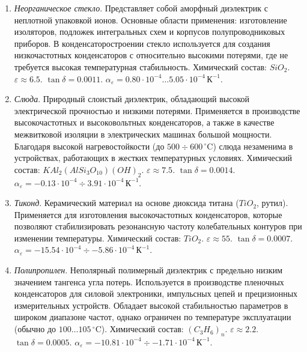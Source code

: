\begin{enumerate}
    \item \textit{Неорганическое стекло}.
    Представляет собой аморфный диэлектрик с неплотной упаковкой ионов.
    Основные области применения: изготовление изоляторов, подложек интегральных схем и корпусов полупроводниковых приборов.
    В конденсаторостроении стекло используется для создания низкочастотных конденсаторов с относительно высокими потерями, где не требуется высокая температурная стабильность.
    Химический состав: $SiO_2$.
    $\varepsilon \approx 6.5$.
    $\tan\delta = 0.0011$.
    $\alpha_\varepsilon = 0.80 \cdot 10^{-4} \dots 5.05 \cdot 10^{-4}\,\text{К}^{-1}$.

    \item \textit{Слюда}.
    Природный слоистый диэлектрик, обладающий высокой электрической прочностью и низкими потерями.
    Применяется в производстве высокочастотных и высоковольтных конденсаторов, а также в качестве межвитковой изоляции в электрических машинах большой мощности.
    Благодаря высокой нагревостойкости (до $500 \div 600\,^\circ\text{C}$) слюда незаменима в устройствах, работающих в жестких температурных условиях.
    Химический состав: $KAl_2(AlSi_3O_{10})(OH)_2$.
    $\varepsilon \approx 7.5$.
    $\tan\delta = 0.0014$.
    $\alpha_\varepsilon = -0.13 \cdot 10^{-4} \div 3.91 \cdot 10^{-4}\,\text{К}^{-1}$.

    \item \textit{Тиконд}.
    Керамический материал на основе диоксида титана ($TiO_2$, рутил).
    Применяется для изготовления высокочастотных конденсаторов, которые позволяют стабилизировать резонансную частоту колебательных контуров при изменении температуры.
    Химический состав: $TiO_2$.
    $\varepsilon \approx 55$.
    $\tan\delta = 0.0007$.
    $\alpha_\varepsilon = -15.54 \cdot 10^{-4} \div -5.86 \cdot 10^{-4}\,\text{К}^{-1}$.

    \item \textit{Полипропилен}.
    Неполярный полимерный диэлектрик с предельно низким значением тангенса угла потерь.
    Используется в производстве пленочных конденсаторов для силовой электроники, импульсных цепей и прецизионных измерительных устройств.
    Обладает высокой стабильностью параметров в широком диапазоне частот, однако ограничен по температуре эксплуатации (обычно до $100 \dots 105\,^\circ\text{C}$).
    Химический состав: $(C_3H_6)_n$.
    $\varepsilon \approx 2.2$.
    $\tan\delta = 0.0005$.
    $\alpha_\varepsilon = -10.81 \cdot 10^{-4} \div -1.71 \cdot 10^{-4}\,\text{К}^{-1}$.


\end{enumerate}
